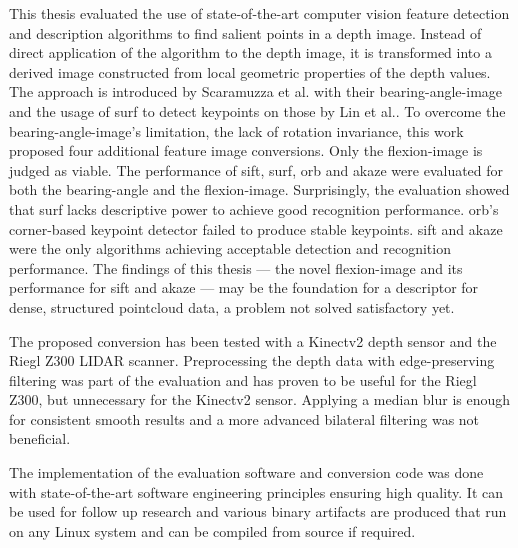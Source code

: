 This thesis evaluated the use of state-of-the-art computer vision feature detection and description algorithms to find salient points in a depth image.
Instead of direct application of the algorithm to the depth image, it is transformed into a derived image constructed from local geometric properties of the depth values.
The approach is introduced by Scaramuzza et al.\cite{scaramuzza_iros2007} with their \gls{bearing-angle-image} and the usage of \acrshort{surf} to detect keypoints on those by Lin et al.\cite{lin_easp2017}.
To overcome the \gls{bearing-angle-image}'s limitation, the lack of rotation invariance, this work proposed four additional feature image conversions.
Only the \gls{flexion-image} is judged as viable.
The performance of \acrshort{sift}, \acrshort{surf}, \acrshort{orb} and \acrshort{akaze} were evaluated for both the \gls{bearing-angle} and the \gls{flexion-image}.
Surprisingly, the evaluation showed that \acrshort{surf} lacks descriptive power to achieve good recognition performance.
\acrshort{orb}'s corner-based keypoint detector failed to produce stable keypoints.
\acrshort{sift} and \acrshort{akaze} were the only algorithms achieving acceptable detection and recognition performance.
The findings of this thesis --- the novel \gls{flexion-image} and its performance for \acrshort{sift} and \acrshort{akaze} --- may be the foundation for a descriptor for dense, structured pointcloud data, a problem not solved satisfactory yet.

The proposed conversion has been tested with a Kinectv2 depth sensor and the Riegl Z300 \acrshort{LIDAR} scanner.
Preprocessing the depth data with edge-preserving filtering was part of the evaluation and has proven to be useful for the Riegl Z300, but unnecessary for the Kinectv2 sensor.
Applying a median blur is enough for consistent smooth results and a more advanced bilateral filtering was not beneficial.

The implementation of the evaluation software and conversion code was done with state-of-the-art software engineering principles ensuring high quality.
It can be used for follow up research and various binary artifacts are produced that run on any Linux system and can be compiled from source if required.
